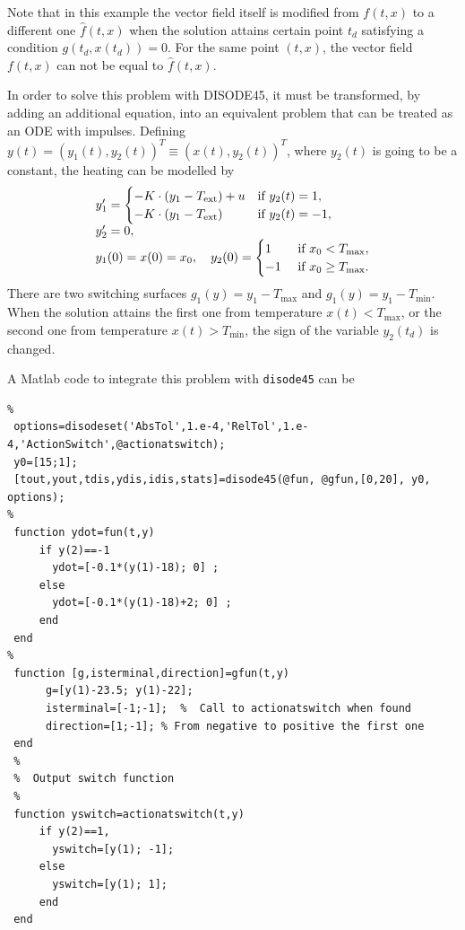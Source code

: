 \documentclass{article}
\begin{document}
\begin{description}
Note that in this example
the vector field itself is modified from $f(t,x)$ to a different one
$\hat f(t,x)$ when the solution
attains certain point $t_d$ satisfying a condition $g(t_d,x(t_d))=0$.
For the same point $(t,x)$, the vector field
$f(t,x)$ can not be equal to  $\hat f(t,x)$.

In order to solve this problem with DISODE45, it must be transformed, by adding an additional equation, into an equivalent problem that can be treated as an ODE with impulses.  Defining
$y(t)=(y_1(t), y_2(t))^T \equiv (x(t), y_2(t))^T$, where $y_2(t)$ is going to be a constant,
the heating can be modelled by
\[
\begin{array}{l}
y_1'=\begin{cases}
-K\cdot(y_1-T_{\hbox{\scriptsize ext}})+ u & \hbox{if } y_2(t) =1, \\
-K\cdot(y_1-T_{\hbox{\scriptsize ext}})& \hbox{if } y_2(t) =-1,
\end{cases}
\\
y_2'= 0, \\
y_1(0)=x(0)= x_0, \quad y_2(0)=
\begin{cases}
1 & \hbox{ if }  x_0 < T_{\max},\\
-1 &  \hbox{ if }  x_0 \ge  T_{\max}. \end{cases}
\end{array}
\]
There are two switching surfaces $g_1(y)=y_1-T_{\max}$ and
$g_1(y)=y_1-T_{\min}$.  When the solution attains the first one from temperature
$x(t) <T_{\max}$, or the second one from temperature $x(t) > T_{\min}$,
the sign of the variable $y_2(t_d)$ is changed.

A Matlab code to integrate this problem with \texttt{disode45} can be

\bigskip

\begin{verbatim}
%
 options=disodeset('AbsTol',1.e-4,'RelTol',1.e-4,'ActionSwitch',@actionatswitch);
 y0=[15;1];
 [tout,yout,tdis,ydis,idis,stats]=disode45(@fun, @gfun,[0,20], y0, options);
%
 function ydot=fun(t,y)
     if y(2)==-1
       ydot=[-0.1*(y(1)-18); 0] ;
     else
       ydot=[-0.1*(y(1)-18)+2; 0] ;
     end
 end
%
 function [g,isterminal,direction]=gfun(t,y)
      g=[y(1)-23.5; y(1)-22];
      isterminal=[-1;-1];  %  Call to actionatswitch when found
      direction=[1;-1]; % From negative to positive the first one
 end
 %
 %  Output switch function
 %
 function yswitch=actionatswitch(t,y)
     if y(2)==1,
       yswitch=[y(1); -1];
     else
       yswitch=[y(1); 1];
     end
 end
 \end{verbatim}


\end{description}
\end{document}
